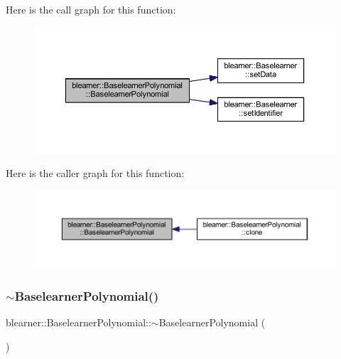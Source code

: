 Here is the call graph for this function\+:
\nopagebreak
\begin{figure}[H]
\begin{center}
\leavevmode
\includegraphics[width=350pt]{classblearner_1_1_baselearner_polynomial_aba0f1e5bf9566dc7bc674c9d30b44af6_cgraph}
\end{center}
\end{figure}
Here is the caller graph for this function\+:
\nopagebreak
\begin{figure}[H]
\begin{center}
\leavevmode
\includegraphics[width=350pt]{classblearner_1_1_baselearner_polynomial_aba0f1e5bf9566dc7bc674c9d30b44af6_icgraph}
\end{center}
\end{figure}
\mbox{\label{classblearner_1_1_baselearner_polynomial_abb799eceb2808fcca4c8041e2ae7abe4}} 
\subsubsection{\texorpdfstring{$\sim$\+Baselearner\+Polynomial()}{~BaselearnerPolynomial()}}
{\footnotesize\ttfamily blearner\+::\+Baselearner\+Polynomial\+::$\sim$\+Baselearner\+Polynomial (\begin{DoxyParamCaption}{ }\end{DoxyParamCaption})}



